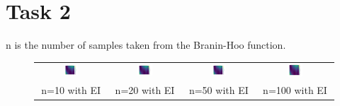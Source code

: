 \documentclass[11pt]{article}
\begin{document}
\newpage

\section{Task 2}

n is the number of samples taken from the Branin-Hoo function.

\begin{figure}[H]
    \centering
    \begin{tabular}{cccc}
        \includegraphics[width=0.225\textwidth]{../Task-02/plots/true_function_rbf_n10_EI.png} &
        \includegraphics[width=0.225\textwidth]{../Task-02/plots/true_function_rbf_n20_EI.png} &
        \includegraphics[width=0.225\textwidth]{../Task-02/plots/true_function_rbf_n50_EI.png} &
        \includegraphics[width=0.225\textwidth]{../Task-02/plots/true_function_rbf_n100_EI.png} \\
        n=10 with EI & n=20 with EI & n=50 with EI & n=100 with EI \\[0.5em]
        

\end{tabular}
\end{figure}
\end{document}
